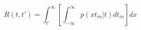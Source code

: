 \begin{equation}
R(t,t') = \int_{t'}^\infty \left[ \int_{-\infty}^\infty p(xt_{in}|t) dt_{in} \right]  dx
\end{equation}